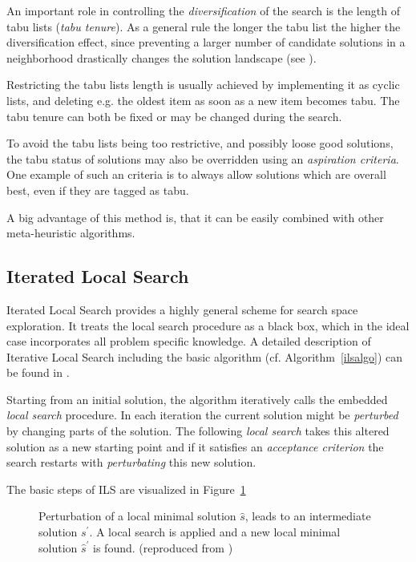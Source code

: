 An important role in controlling the \emph{diversification} of the search is the length of tabu lists (\emph{tabu tenure}).  
As a general rule the longer the tabu list the higher the diversification effect, since preventing a larger number of candidate solutions in a neighborhood drastically changes the solution landscape (see \cite{blum2003metaheuristics}). 

Restricting the tabu lists length is usually achieved by implementing it as cyclic lists, and deleting e.g. the oldest item as soon as a new item becomes tabu. 
The tabu tenure can both be fixed or may be changed during the search.

To avoid the tabu lists being too restrictive, and possibly loose good solutions, the tabu status of solutions may also be overridden using an \emph{aspiration criteria}. One example of such an criteria is to always allow solutions which are overall best, even if they are tagged as tabu.

A big advantage of this method is, that it can be easily combined with other meta-heuristic algorithms.

\subsection{Iterated Local Search}\label{sec:ils}
Iterated Local Search provides a highly general scheme for search space exploration. 
It treats the local search procedure as a black box, which in the ideal case incorporates all problem specific knowledge. 
A detailed description of Iterative Local Search including the basic algorithm (cf. Algorithm~\ref{ilsalgo}) can be found in \cite{lourencco2001iterated}.

Starting from an initial solution, the algorithm iteratively calls the embedded \emph{local search} procedure.
In each iteration the current solution might be \emph{perturbed} by changing parts of the solution. 
The following \emph{local search} takes this altered solution as a new starting point and if it satisfies an \emph{acceptance criterion} the search restarts with \emph{perturbating} this new solution. 

The basic steps of ILS are visualized in Figure~\ref{fig:fig_ils}

\begin{figure}[thb] 
   \footnotesize
   \centering
    \def\svgwidth{0.75\textwidth}
    
    \caption[Perturbation step in ILS]{Perturbation of a local minimal solution $\hat{s}$, leads to an intermediate solution $s^\prime$. A local search is applied and a new local minimal solution $\hat{s}^\prime$ is found. (reproduced from \cite{blum2003metaheuristics})}  
     \label{fig:fig_ils}
\end{figure}

